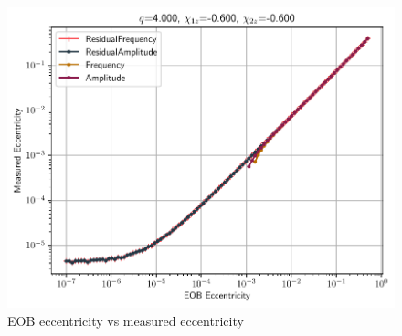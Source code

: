 \documentclass[aps,prd,amsmath,floats,floatfix, twocolumn,
superscriptaddress,nofootinbib,showpacs]{revtex4-1}
\begin{document}
\begin{figure}[thb]
\includegraphics[width=\columnwidth]{test_eob_vs_measured_ecc_example}
\caption{EOB eccentricity vs measured eccentricity}
\label{fig:eob_vs_measured_ecc}
\end{figure}
\end{document}

